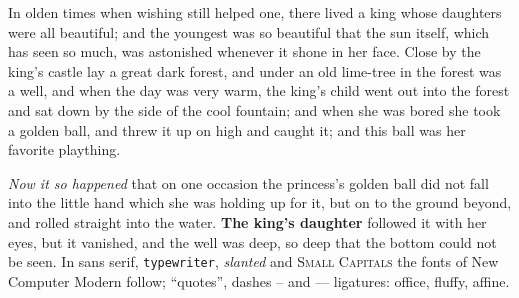 In olden times when wishing still helped one, there lived a king whose daughters were all
beautiful; and the youngest was so beautiful that the sun itself, which has seen so much, was
astonished whenever it shone in her face. Close by the king's castle lay a great dark forest,
and under an old lime-tree in the forest was a well, and when the day was very warm, the
king's child went out into the forest and sat down by the side of the cool fountain; and when
she was bored she took a golden ball, and threw it up on high and caught it; and this ball was
her favorite plaything.

\emph{Now it so happened} that on one occasion the princess's golden ball did not fall into the
little hand which she was holding up for it, but on to the ground beyond, and rolled straight
into the water. \textbf{The king's daughter} followed it with her eyes, but it vanished, and
the well was deep, so deep that the bottom could not be seen. In \textsf{sans serif},
\texttt{typewriter}, \textsl{slanted} and \textsc{Small Capitals} the fonts of New Computer
Modern follow; ``quotes'', dashes -- and --- ligatures: office, fluffy, affine.
